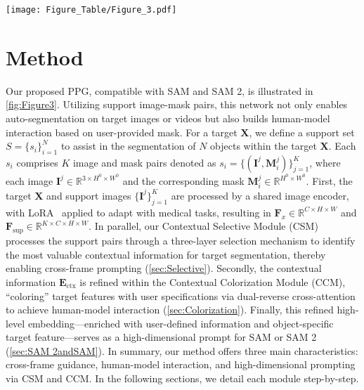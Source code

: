  \begin{figure*}
  \centering
  \setlength{\abovecaptionskip}{3pt}
   \texttt{[image: Figure\_Table/Figure\_3.pdf]}
   \caption{Designed Proxy Prompt Generator for both SAM 2 and SAM. Our key designed focus on the Contextual Selective Module and the Contextual Colorization Module. The Encoder and Decoder refer to the original structures, which are frozen.}
   \label{fig:Figure3}
   \vspace{-15pt}
\end{figure*}
\section{Method}
\label{sec:method}

Our proposed PPG, compatible with SAM and SAM 2, is illustrated in \cref{fig:Figure3}. Utilizing support image-mask pairs, this network not only enables auto-segmentation on target images or videos but also builds human-model interaction based on user-provided mask. For a target \(\mathbf{X}\), we define a support set \({S} = \{ {s}_i \}_{i=1}^N\) to assist in the segmentation of \(N\) objects within the target \(\mathbf{X}\). Each \({s}_i\) comprises \(K\) image and mask pairs denoted as \({s}_i = \{ (\mathbf{I}^j, \mathbf{M}_i^j) \}_{j=1}^K\), where each image \(\mathbf{I}^j \in \mathbb{R}^{3 \times H^0 \times W^0}\) and the corresponding mask \(\mathbf{M}_i^j \in \mathbb{R}^{H^0 \times W^0}\). First, the target \(\mathbf{X}\) and support images \(\{ \mathbf{I}^j \}_{j=1}^K\) are processed by a shared image encoder, with LoRA~\cite{hu2021lora} applied to adapt with medical tasks, resulting in \(\mathbf{F}_x \in \mathbb{R}^{ C \times H \times W}\) and \(\mathbf{F}_{\text{sup}} \in \mathbb{R}^{ K \times C \times H \times W}\). In parallel, our Contextual Selective Module (CSM) processes the support pairs through a three-layer selection mechanism to identify the most valuable contextual information for target segmentation, thereby enabling cross-frame prompting (\cref{sec:Selective}). Secondly, the contextual information \(\mathbf{E}_{\text{ctx}}\) is refined within the Contextual Colorization Module (CCM), ``coloring'' target features with user specifications via dual-reverse cross-attention to achieve human-model interaction (\cref{sec:Colorization}). Finally, this refined high-level embedding—enriched with user-defined information and object-specific target feature—serves as a high-dimensional prompt for SAM or SAM 2 (\cref{sec:SAM 2andSAM}). In summary, our method offers three main characteristics: cross-frame guidance, human-model interaction, and high-dimensional prompting via CSM and CCM. In the following sections, we detail each module step-by-step.


